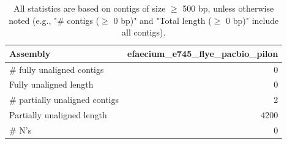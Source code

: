 \documentclass[12pt,a4paper]{article}
\begin{document}
\begin{table}[ht]
\begin{center}
\caption{All statistics are based on contigs of size $\geq$ 500 bp, unless otherwise noted (e.g., "\# contigs ($\geq$ 0 bp)" and "Total length ($\geq$ 0 bp)" include all contigs).}
\begin{tabular}{|l*{1}{|r}|}
\hline
Assembly & efaecium\_e745\_flye\_pacbio\_pilon \\ \hline
\# fully unaligned contigs & 0 \\ \hline
Fully unaligned length & 0 \\ \hline
\# partially unaligned contigs & 2 \\ \hline
Partially unaligned length & 4200 \\ \hline
\# N's & 0 \\ \hline
\end{tabular}
\end{center}
\end{table}
\end{document}
